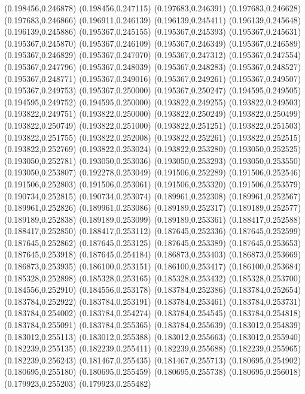 (0.198456,0.246878)
(0.198456,0.247115)
(0.197683,0.246391)
(0.197683,0.246628)
(0.197683,0.246866)
(0.196911,0.246139)
(0.196139,0.245411)
(0.196139,0.245648)
(0.196139,0.245886)
(0.195367,0.245155)
(0.195367,0.245393)
(0.195367,0.245631)
(0.195367,0.245870)
(0.195367,0.246109)
(0.195367,0.246349)
(0.195367,0.246589)
(0.195367,0.246829)
(0.195367,0.247070)
(0.195367,0.247312)
(0.195367,0.247554)
(0.195367,0.247796)
(0.195367,0.248039)
(0.195367,0.248283)
(0.195367,0.248527)
(0.195367,0.248771)
(0.195367,0.249016)
(0.195367,0.249261)
(0.195367,0.249507)
(0.195367,0.249753)
(0.195367,0.250000)
(0.195367,0.250247)
(0.194595,0.249505)
(0.194595,0.249752)
(0.194595,0.250000)
(0.193822,0.249255)
(0.193822,0.249503)
(0.193822,0.249751)
(0.193822,0.250000)
(0.193822,0.250249)
(0.193822,0.250499)
(0.193822,0.250749)
(0.193822,0.251000)
(0.193822,0.251251)
(0.193822,0.251503)
(0.193822,0.251755)
(0.193822,0.252008)
(0.193822,0.252261)
(0.193822,0.252515)
(0.193822,0.252769)
(0.193822,0.253024)
(0.193822,0.253280)
(0.193050,0.252525)
(0.193050,0.252781)
(0.193050,0.253036)
(0.193050,0.253293)
(0.193050,0.253550)
(0.193050,0.253807)
(0.192278,0.253049)
(0.191506,0.252289)
(0.191506,0.252546)
(0.191506,0.252803)
(0.191506,0.253061)
(0.191506,0.253320)
(0.191506,0.253579)
(0.190734,0.252815)
(0.190734,0.253074)
(0.189961,0.252308)
(0.189961,0.252567)
(0.189961,0.252826)
(0.189961,0.253086)
(0.189189,0.252317)
(0.189189,0.252577)
(0.189189,0.252838)
(0.189189,0.253099)
(0.189189,0.253361)
(0.188417,0.252588)
(0.188417,0.252850)
(0.188417,0.253112)
(0.187645,0.252336)
(0.187645,0.252599)
(0.187645,0.252862)
(0.187645,0.253125)
(0.187645,0.253389)
(0.187645,0.253653)
(0.187645,0.253918)
(0.187645,0.254184)
(0.186873,0.253403)
(0.186873,0.253669)
(0.186873,0.253935)
(0.186100,0.253151)
(0.186100,0.253417)
(0.186100,0.253684)
(0.185328,0.252898)
(0.185328,0.253165)
(0.185328,0.253432)
(0.185328,0.253700)
(0.184556,0.252910)
(0.184556,0.253178)
(0.183784,0.252386)
(0.183784,0.252654)
(0.183784,0.252922)
(0.183784,0.253191)
(0.183784,0.253461)
(0.183784,0.253731)
(0.183784,0.254002)
(0.183784,0.254274)
(0.183784,0.254545)
(0.183784,0.254818)
(0.183784,0.255091)
(0.183784,0.255365)
(0.183784,0.255639)
(0.183012,0.254839)
(0.183012,0.255113)
(0.183012,0.255388)
(0.183012,0.255663)
(0.183012,0.255940)
(0.182239,0.255135)
(0.182239,0.255411)
(0.182239,0.255688)
(0.182239,0.255965)
(0.182239,0.256243)
(0.181467,0.255435)
(0.181467,0.255713)
(0.180695,0.254902)
(0.180695,0.255180)
(0.180695,0.255459)
(0.180695,0.255738)
(0.180695,0.256018)
(0.179923,0.255203)
(0.179923,0.255482)
